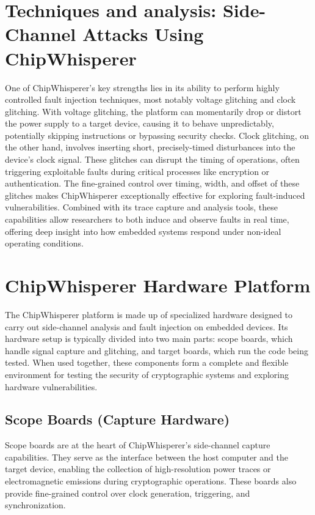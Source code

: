 \section*{Techniques and analysis: Side-Channel Attacks Using ChipWhisperer }
One of ChipWhisperer’s key strengths lies in its ability to perform highly controlled fault injection techniques, most notably voltage glitching and clock glitching. With voltage glitching, the platform can momentarily drop or distort the power supply to a target device, causing it to behave unpredictably, potentially skipping instructions or bypassing security checks. Clock glitching, on the other hand, involves inserting short, precisely-timed disturbances into the device’s clock signal. These glitches can disrupt the timing of operations, often triggering exploitable faults during critical processes like encryption or authentication. The fine-grained control over timing, width, and offset of these glitches makes ChipWhisperer exceptionally effective for exploring fault-induced vulnerabilities. Combined with its trace capture and analysis tools, these capabilities allow researchers to both induce and observe faults in real time, offering deep insight into how embedded systems respond under non-ideal operating conditions.
\section{ChipWhisperer Hardware Platform}
The ChipWhisperer platform is made up of specialized hardware designed to carry out side-channel analysis and fault injection on embedded devices. Its hardware setup is typically divided into two main parts: scope boards, which handle signal capture and glitching, and target boards, which run the code being tested. When used together, these components form a complete and flexible environment for testing the security of cryptographic systems and exploring hardware vulnerabilities.
\subsection{Scope Boards (Capture Hardware)}
Scope boards are at the heart of ChipWhisperer's side-channel capture capabilities. They serve as the interface between the host computer and the target device, enabling the collection of high-resolution power traces or electromagnetic emissions during cryptographic operations. These boards also provide fine-grained control over clock generation, triggering, and synchronization.

